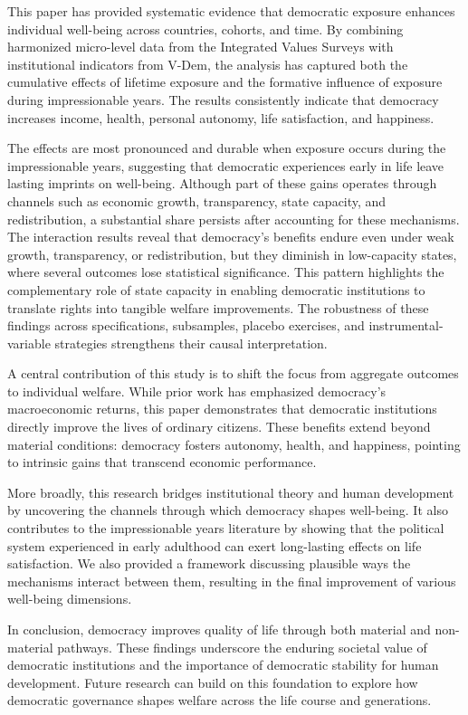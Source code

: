 \documentclass[11pt]{article}
\begin{document}
This paper has provided systematic evidence that democratic exposure enhances individual well-being across countries, cohorts, and time. By combining harmonized micro-level data from the Integrated Values Surveys with institutional indicators from V-Dem, the analysis has captured both the cumulative effects of lifetime exposure and the formative influence of exposure during impressionable years. The results consistently indicate that democracy increases income, health, personal autonomy, life satisfaction, and happiness.

The effects are most pronounced and durable when exposure occurs during the impressionable years, suggesting that democratic experiences early in life leave lasting imprints on well-being. Although part of these gains operates through channels such as economic growth, transparency, state capacity, and redistribution, a substantial share persists after accounting for these mechanisms. The interaction results reveal that democracy’s benefits endure even under weak growth, transparency, or redistribution, but they diminish in low-capacity states, where several outcomes lose statistical significance. This pattern highlights the complementary role of state capacity in enabling democratic institutions to translate rights into tangible welfare improvements. The robustness of these findings across specifications, subsamples, placebo exercises, and instrumental-variable strategies strengthens their causal interpretation.

A central contribution of this study is to shift the focus from aggregate outcomes to individual welfare. While prior work has emphasized democracy’s macroeconomic returns, this paper demonstrates that democratic institutions directly improve the lives of ordinary citizens. These benefits extend beyond material conditions: democracy fosters autonomy, health, and happiness, pointing to intrinsic gains that transcend economic performance.

More broadly, this research bridges institutional theory and human development by uncovering the channels through which democracy shapes well-being. It also contributes to the impressionable years literature by showing that the political system experienced in early adulthood can exert long-lasting effects on life satisfaction. We also provided a framework discussing plausible ways the mechanisms interact between them, resulting in the final improvement of various well-being dimensions. 

In conclusion, democracy improves quality of life through both material and non-material pathways. These findings underscore the enduring societal value of democratic institutions and the importance of democratic stability for human development. Future research can build on this foundation to explore how democratic governance shapes welfare across the life course and generations.
\end{document}
